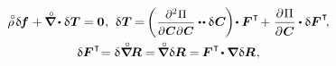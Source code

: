 \begin{otherlanguage}{russian}
\nopagebreak\vspace{-0.05em}\begin{equation}\begin{array}{c}
\mathcircabove{\rho} \hspace{.25ex} \variation{\hspace{-0.2ex}\bm{f}} \hspace{0.16ex} + \hspace{-0.1ex} \boldnablacircled \hspace{-0.12ex} \dotp \variation{\hspace{.1ex}\firstpiolakirchhoffstress} = \bm{0} \hspace{0.1ex}, \:\,
%
\variation{\hspace{.1ex}\firstpiolakirchhoffstress} \hspace{-0.1ex} = \hspace{-0.2ex} \left( \hspace{0.1ex} \scalebox{0.92}{$ \displaystyle \frac{\partial^2 \hspace{0.1ex} \Pi}{\raisemath{-0.1em}{\partial \hspace{0.1ex} \bm{C} \hspace{0.1ex} \partial \hspace{0.1ex} \bm{C}}} $} \dotdotp \variation{\hspace{.12ex}\bm{C}} \hspace{-0.16ex} \right) \hspace{-0.32ex} \dotp \bm{F}^{\hspace{.1ex}\T} \hspace{-0.24ex} + \hspace{0.1ex}
\displaystyle \frac{\partial \hspace{0.1ex} \Pi}{\raisemath{-0.1em}{\partial \hspace{0.1ex} \bm{C}}} \dotp \variation{\bm{F}}^{\hspace{.1ex}\T} \hspace{-0.4ex} , \\[1em]
%
\variation{\bm{F}}^{\hspace{.1ex}\T} \hspace{-0.5ex}
= \variation{\hspace{.1ex} \boldnablacircled \hspace{-0.16ex} \bm{R}}
= \hspace{-0.2ex} \boldnablacircled \hspace{.1ex} \variation{\bm{R}}
= \hspace{-0.12ex} \bm{F}^{\hspace{.1ex}\T} \hspace{-0.25ex} \dotp \boldnabla \hspace{.1ex} \variation{\bm{R}} \hspace{.16ex},

\end{array}
\end{equation}
\end{otherlanguage}
